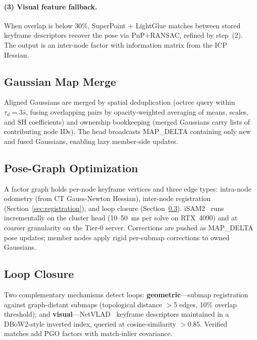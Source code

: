 \paragraph{(3) Visual feature fallback.} When overlap is below 30\%, SuperPoint
+ LightGlue matches between stored keyframe descriptors recover the pose via
PnP+RANSAC, refined by step~(2). The output is an inter-node factor with
information matrix from the ICP Hessian.

\subsection{Gaussian Map Merge}

\label{sec:merge}

Aligned Gaussians are merged by spatial deduplication (octree query within
$\tau_d=3\bar{s}$, fusing overlapping pairs by opacity-weighted averaging
of means, scales, and SH coefficients) and ownership bookkeeping (merged
Gaussians carry lists of contributing node IDs). The head broadcasts MAP\_DELTA
containing only new and fused Gaussians, enabling lazy member-side updates.

\subsection{Pose-Graph Optimization}

\label{sec:pgo}

A factor graph holds per-node keyframe vertices and three edge types:
intra-node odometry (from CT Gauss-Newton Hessian), inter-node registration
(Section~\ref{sec:registration}), and loop closure
(Section~\ref{sec:loop}). iSAM2~\cite{gtsam_mob} runs incrementally on the
cluster head (10--50~ms per solve on RTX~4090) and at coarser granularity on
the Tier-0 server. Corrections are pushed as MAP\_DELTA pose updates; member
nodes apply rigid per-submap corrections to owned Gaussians.

\subsection{Loop Closure}

\label{sec:loop}

Two complementary mechanisms detect loops: \textbf{geometric}---submap
registration against graph-distant submaps (topological distance $>$5 edges,
10\% overlap threshold); and \textbf{visual}---NetVLAD~\cite{arandjelovic2016netvlad}
keyframe descriptors maintained in a DBoW2-style inverted index, queried at
cosine-similarity $>$0.85. Verified matches add PGO factors with match-inlier
covariance.

